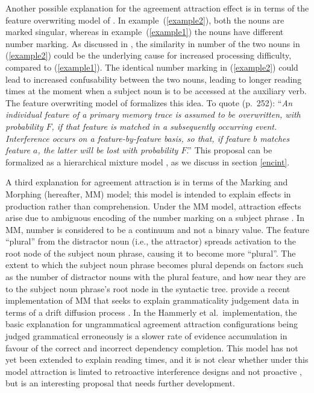 \documentclass{cambridge7A}\usepackage[]{graphicx}\usepackage[]{color}
\begin{document}
Another possible explanation for the agreement attraction effect is in terms of the  feature overwriting model of \cite{Nairne1990}. In example~(\ref{example2}),
both the nouns are marked singular, whereas in example~(\ref{example1}) the nouns have different number marking. 
As discussed in \cite{VillataFranck},
the similarity in number of the two nouns in (\ref{example2}) could be the underlying cause for increased processing difficulty, compared to (\ref{example1}).
The identical number marking in (\ref{example2}) could lead to increased  confusability between the two nouns, leading to longer reading times at the moment when a subject noun is to be accessed at the auxiliary verb. 
The feature overwriting model of \cite{Nairne1990} formalizes this idea. To quote (p.\ 252):
``\textit{An individual feature of a primary memory trace is assumed to be overwritten, with probability $F$, if that feature is matched in a subsequently occurring event. Interference occurs on a feature-by-feature basis, so that, if feature $b$ matches feature $a$, the latter will be lost with probability $F$}.''
 This proposal can be formalized as a hierarchical mixture model \citep{VasishthEtAlICCM2017}, as we discuss in section \ref{encint}.

A third explanation for agreement attraction is in terms of the  Marking and Morphing (hereafter, MM) model; this model is intended to explain effects in production rather than comprehension.  Under the MM model, attraction effects arise due to ambiguous encoding of the number marking on a subject phrase \citep[e.g.,][]{EberhardCuttingBock2005}. In MM, number is considered to be a continuum and not a binary value. The feature ``plural'' from the distractor noun (i.e., the attractor) spreads activation to the root node of the subject noun phrase, causing it to become more ``plural''. The extent to which the subject noun phrase becomes plural depends on factors such as the number of distractor nouns with the plural feature, and how near they are to the subject noun phrase's root node in the syntactic tree. \cite{hammerly2019grammaticality} provide a recent implementation of MM that seeks to explain grammaticality judgement data in terms of a  drift diffusion process \citep{Ratcliff1978}. In the Hammerly  et al.\ implementation, the basic explanation for ungrammatical agreement attraction configurations being judged grammatical erroneously is a slower rate of evidence accumulation in favour of the correct and incorrect dependency completion. This model has not yet been extended to explain reading times,  and it is not clear whether under this model attraction is limted to retroactive interference designs and not proactive \citep{ALV2020},  but is an interesting proposal that needs further development.
\end{document}
